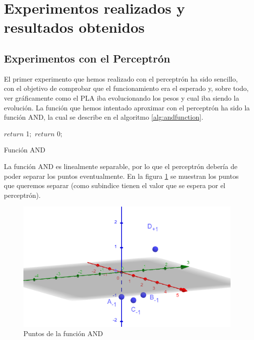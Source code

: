 \section{Experimentos realizados y resultados obtenidos}
\subsection{Experimentos con el Perceptrón}
\label{subsec:perceptronexperiment}

El primer experimento que hemos realizado con el perceptrón ha sido sencillo, con el objetivo de comprobar que el funcionamiento era el esperado y, sobre todo, ver gráficamente como el PLA iba evolucionando los pesos y cual iba siendo la evolución. La función que hemos intentado aproximar con el perceptrón ha sido la función AND, la cual se describe en el algoritmo \ref{alg:andfunction}.

\begin{algorithm}
    
    {
        $return$ 1$;$
    }
    {
        $return$ 0$;$
    }

	\caption{Función AND}
	\label{alg:andfunction}
\end{algorithm}

La función AND es linealmente separable, por lo que el perceptrón debería de poder separar los puntos eventualmente. En la figura \ref{fig:andFunctionTargets} se muestran los puntos que queremos separar (como subindice tienen el valor que se espera por el perceptrón).

\begin{figure}[h]
	\centering
	\includegraphics[width=1\textwidth]{Figures/PerceptronTargets}
	\caption{Puntos de la función AND}
	\label{fig:andFunctionTargets}
\end{figure}



